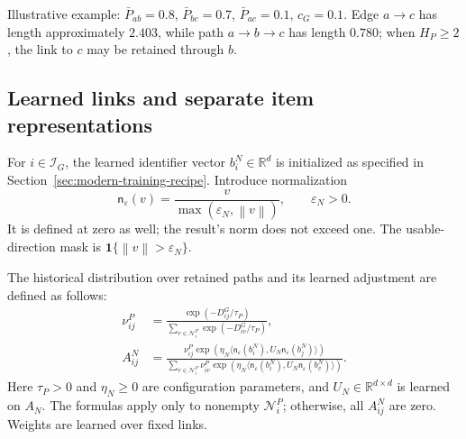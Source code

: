 \documentclass[12pt,a4paper]{article}
\newcommand{\R}{\mathbb R}
\newcommand{\ind}{\mathbf 1}
\newcommand{\eps}{\varepsilon}
\newcommand{\norm}[1]{\left\lVert#1\right\rVert}
\theoremstyle{plainru}
\begin{document}
Illustrative example: $\bar P_{ab}=0.8$, $\bar P_{bc}=0.7$,
$\bar P_{ac}=0.1$, $c_G=0.1$. Edge $a\to c$ has length approximately
$2.403$, while path $a\to b\to c$ has length $0.780$; when $H_P\ge2$,
the link to $c$ may be retained through $b$.

\subsection{Learned links and separate item representations}
\label{sec:modern-item}

For $i\in\mathcal I_G$, the learned identifier vector $b_i^N\in\R^d$
is initialized as specified in Section~\ref{sec:modern-training-recipe}. Introduce normalization
\begin{equation}\label{eq:modern-normalize}
\mathsf n_\eps(v)=\frac{v}{\max(\eps_N,\norm{v})},\qquad\eps_N>0.
\end{equation}
It is defined at zero as well; the result's norm does not exceed one.
The usable-direction mask is $\ind\{\norm{v}>\eps_N\}$.

The historical distribution over retained paths and its learned
adjustment are defined as follows:
\begin{align}\label{eq:modern-edge-attention}
\nu_{ij}^{P}
&=\frac{\exp(-D_{ij}^{G}/\tau_P)}
{\sum_{v\in\mathcal N_i^P}\exp(-D_{iv}^{G}/\tau_P)},\\
A_{ij}^{N}
&=\frac{\nu_{ij}^{P}\exp(\eta_N\langle
\mathsf n_\eps(b_i^N),U_N\mathsf n_\eps(b_j^N)\rangle)}
{\sum_{v\in\mathcal N_i^P}\nu_{iv}^{P}\exp(\eta_N\langle
\mathsf n_\eps(b_i^N),U_N\mathsf n_\eps(b_v^N)\rangle)}.
\nonumber
\end{align}
Here $\tau_P>0$ and $\eta_N\ge0$ are configuration parameters,
and $U_N\in\R^{d\times d}$ is learned on $A_N$.
The formulas apply only to nonempty $\mathcal N_i^P$;
otherwise, all $A_{ij}^{N}$ are zero.
Weights are learned over fixed links.
\end{document}
